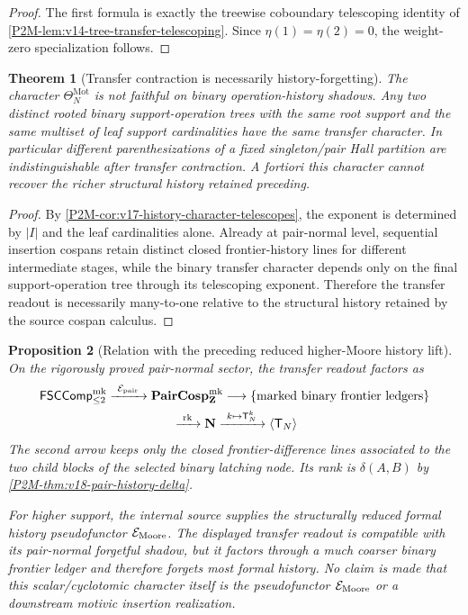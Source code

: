 \documentclass[11pt]{article}
\newtheorem{theorem}{Theorem}[section]
\newtheorem{proposition}[theorem]{Proposition}
\theoremstyle{remark}
\newcommand{\Z}{\mathbf Z}
\newcommand{\Mot}{\mathrm{Mot}}
\providecommand{\FSCComp}{\mathsf{FSCComp}}
\begin{document}
\begin{proof}
The first formula is exactly the treewise coboundary telescoping identity of
\cref{P2M-lem:v14-tree-transfer-telescoping}.  Since $\eta(1)=\eta(2)=0$, the
weight-zero specialization follows.
\end{proof}

\begin{theorem}[Transfer contraction is necessarily history-forgetting]
\label{P2M-thm:v17-transfer-not-history-faithful}
The character $\Theta_N^{\Mot}$ is not faithful on binary operation-history
shadows.  Any two distinct rooted binary support-operation trees with the same
root support and the same multiset of leaf support cardinalities have the
same transfer character.  In particular different parenthesizations of a
fixed singleton/pair Hall partition are indistinguishable after transfer
contraction.  A fortiori this character cannot recover the richer structural
history retained preceding.
\end{theorem}

\begin{proof}
By \cref{P2M-cor:v17-history-character-telescopes}, the exponent is determined by $|I|$ and the leaf cardinalities alone.  Already at pair-normal level, sequential insertion cospans retain distinct closed frontier-history lines for different intermediate stages, while the binary transfer character depends only on the final support-operation tree through its telescoping exponent.  Therefore the transfer readout is necessarily many-to-one relative to the structural history retained by the source cospan calculus.
\end{proof}

\begin{proposition}[Relation with the preceding reduced higher-Moore history lift]
\label{P2M-prop:v20-relation-to-preceding-moore-lift}
On the rigorously proved pair-normal sector, the transfer readout factors as
\[
 \begin{gathered}
 \FSCComp_{\le2}^{\rm mk}
 \xrightarrow{\ \mathcal E_{\rm pair}\ }
 \mathbf{PairCosp}_{\Z}^{\rm mk}
 \longrightarrow
 \{\text{marked binary frontier ledgers}\}\\
 {}\xrightarrow{\ \operatorname{rk}\ }
 \mathbf N
 \xrightarrow{\ k\mapsto\mathsf T_N^k\ }
 \langle\mathsf T_N\rangle
 \end{gathered}
\]
The second arrow keeps only the closed frontier-difference lines associated to
the two child blocks of the selected binary latching node.  Its rank is
$\delta(A,B)$ by \cref{P2M-thm:v18-pair-history-delta}.

For higher support, the internal source supplies the structurally reduced formal
history pseudofunctor $\mathcal E_{\rm Moore}$.  The displayed transfer readout
is compatible with its pair-normal forgetful shadow, but it factors through a
much coarser binary frontier ledger and therefore forgets most formal history.
No claim is made that this scalar/cyclotomic character itself is the
pseudofunctor $\mathcal E_{\rm Moore}$ or a downstream motivic insertion
realization.
\end{proposition}
\end{document}
